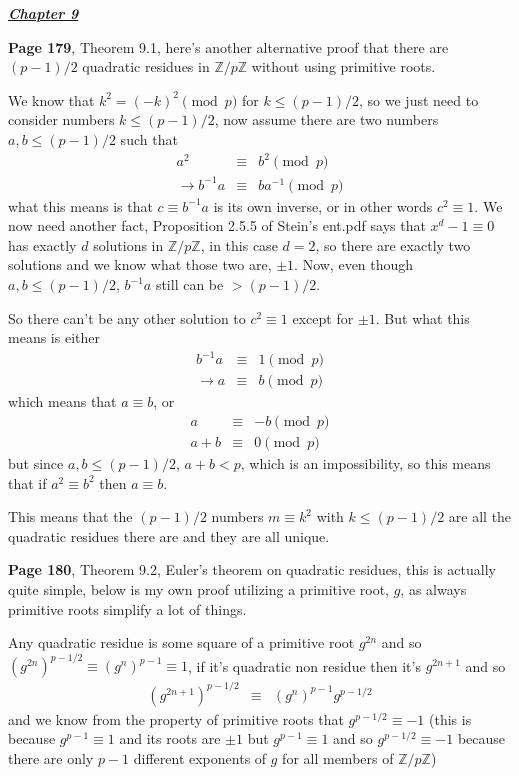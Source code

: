 \documentclass[aps,preprint,preprintnumbers,nofootinbib,showpacs,prd]{revtex4-1}
\newcommand{\nbea}{\begin{eqnarray*}}
\newcommand{\neea}{\end{eqnarray*}}
\begin{document}
\bigskip
\underline{\textbf{\textit{Chapter 9}}}
\bigskip

{\bf Page 179}, Theorem 9.1, here's another alternative proof that there are $(p-1)/2$ quadratic residues in $\mathbb{Z}/p\mathbb{Z}$ without using primitive roots.

We know that $k^2 = (-k)^2 \pmod{p}$ for $k \le (p-1)/2$, so we just need to consider numbers $k \le (p-1)/2$, now assume there are two numbers $a,b \le (p-1)/2$ such that
%
\nbea
a^2 & \equiv & b^2 \pmod{p} \\
\to b^{-1} a & \equiv & b a^{-1} \pmod{p}
\neea
%
what this means is that $c \equiv b^{-1} a$ is its own inverse, or in other words $c^2 \equiv 1$. We now need another fact, Proposition 2.5.5 of Stein's ent.pdf says that $x^d-1 \equiv 0$ has exactly $d$ solutions in $\mathbb{Z}/p\mathbb{Z}$, in this case $d=2$, so there are exactly two solutions and we know what those two are, $\pm 1$. Now, even though $a,b \le (p-1)/2$, $b^{-1}a$ still can be $> (p-1)/2$.

So there can't be any other solution to $c^2 \equiv 1$ except for $\pm 1$. But what this means is either
%
\nbea
b^{-1} a & \equiv & 1 \pmod{p} \\
\to a & \equiv & b \pmod{p}
\neea
%
which means that $a \equiv b$, or
%
\nbea
a & \equiv & -b \pmod{p} \\
a + b & \equiv & 0 \pmod{p}
\neea
%
but since $a,b \le (p-1)/2$, $a+b < p$, which is an impossibility, so this means that if $a^2 \equiv b^2$ then $a \equiv b$.

This means that the $(p-1)/2$ numbers $m \equiv k^2$ with $k \le (p-1)/2$ are all the quadratic residues there are and they are all unique.

{\bf Page 180}, Theorem 9.2, Euler's theorem on quadratic residues, this is actually quite simple, below is my own proof utilizing a primitive root, $g$, as always primitive roots simplify a lot of things.

Any quadratic residue is some square of a primitive root $g^{2n}$ and so $(g^{2n})^{p-1/2} \equiv (g^n)^{p-1} \equiv 1$, if it's quadratic non residue then it's $g^{2n+1}$ and so 
%
\nbea
(g^{2n+1})^{p-1/2} & \equiv & (g^n)^{p-1} g^{p-1/2}
\neea
%
and we know from the property of primitive roots that $g^{p-1/2} \equiv -1$ (this is because $g^{p-1} \equiv 1$ and its roots are $\pm1$ but $g^{p-1} \equiv 1$ and so $g^{p-1/2} \equiv -1$ because there are only $p-1$ different exponents of $g$ for all members of $\mathbb{Z}/p\mathbb{Z}$)
\end{document}
